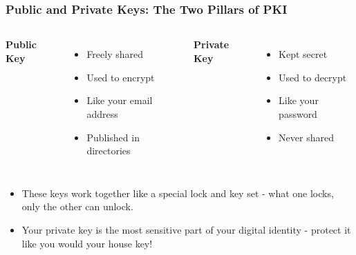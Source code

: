 \documentclass{beamer}
\begin{document}
\begin{frame}
    \frametitle{Public and Private Keys: The Two Pillars of PKI}
    
    \begin{columns}[t]
            \textbf{Public Key}
            \begin{itemize}
                \item Freely shared
                \item Used to encrypt
                \item Like your email address
                \item Published in directories
            \end{itemize}
        
            \textbf{Private Key}
            \begin{itemize}
                \item Kept secret
                \item Used to decrypt
                \item Like your password
                \item Never shared
            \end{itemize}
    \end{columns}
    
    \begin{itemize}
        \item These keys work together like a special lock and key set - what one locks, only the other can unlock.
        \item Your private key is the most sensitive part of your digital identity - protect it like you would your house key!
    \end{itemize}
\end{frame}
\end{document}
